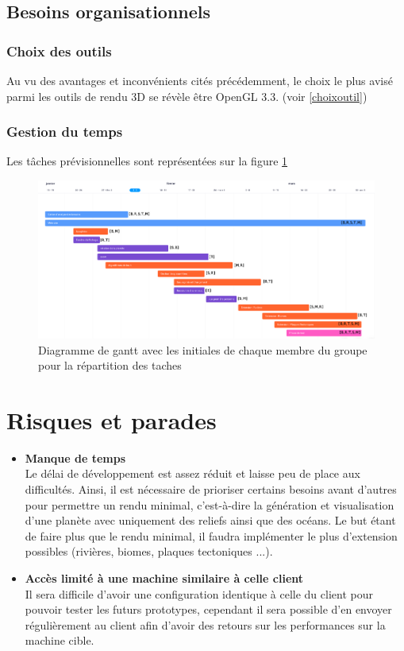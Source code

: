 \documentclass[a4paper]{article}
\begin{document}
    
    \subsection{Besoins organisationnels}
        \subsubsection{Choix des outils}
        Au vu des avantages et inconvénients cités précédemment, le choix le plus avisé parmi les outils de rendu 3D se révèle être OpenGL 3.3. (voir \ref{choixoutil}) 
        \subsubsection{Gestion du temps}
        Les tâches prévisionnelles sont représentées sur la figure \ref{gantt} 
         \begin{figure}[!h]
        
            \includegraphics[scale=0.3]{img/gantt.png}
            \caption{\label{gantt}Diagramme de gantt avec les initiales de chaque membre du groupe pour la répartition des taches}
            
        \end{figure}

\section{Risques et parades}

\begin{itemize}
    \item \textbf{Manque de temps} \\
    Le délai de développement est assez réduit et laisse peu de place aux difficultés. Ainsi, il est nécessaire de prioriser certains besoins avant d'autres pour permettre un rendu minimal, c'est-à-dire la génération et visualisation d'une planète avec uniquement des reliefs ainsi que des océans. 
    Le but étant de faire plus que le rendu minimal, il faudra implémenter le plus d'extension possibles (rivières, biomes, plaques tectoniques ...).
    
    \item \textbf{Accès limité à une machine similaire à celle client} \\
    Il sera difficile d'avoir une configuration identique à celle du client pour pouvoir tester les futurs prototypes, cependant il sera possible d'en envoyer régulièrement au client afin d'avoir des retours sur les performances sur la machine cible.
\end{itemize}
\end{document}
